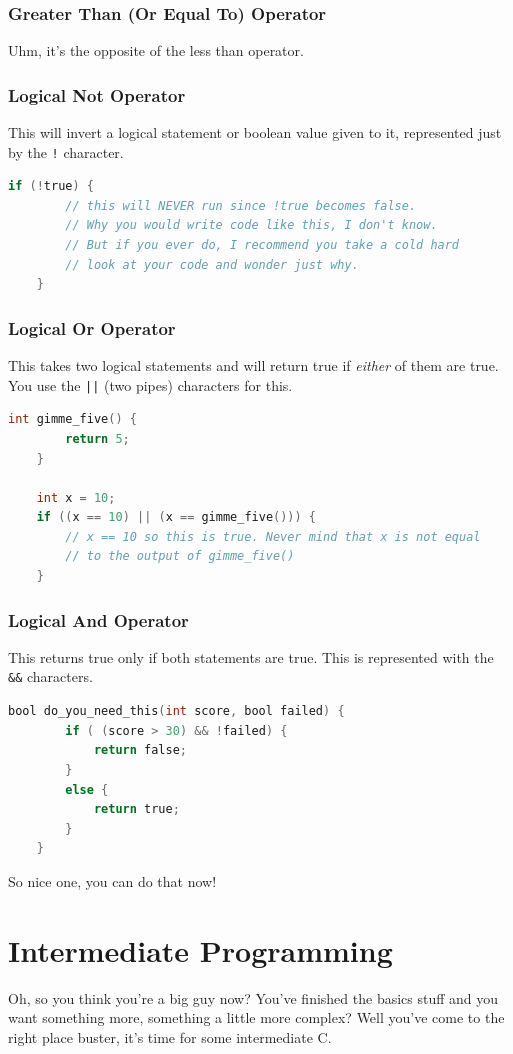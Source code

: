 \subsubsection{Greater Than (Or Equal To) Operator}
Uhm, it's the opposite of the less than operator.

\subsubsection{Logical Not Operator}
This will invert a logical statement or boolean value given to it, represented just by the \texttt{!} character.
\begin{lstlisting}[language=C]
    if (!true) {
        // this will NEVER run since !true becomes false.
        // Why you would write code like this, I don't know.
        // But if you ever do, I recommend you take a cold hard
        // look at your code and wonder just why.
    }
\end{lstlisting}

\subsubsection{Logical Or Operator}
This takes two logical statements and will return true if \textit{either} of them are true. You use the \texttt{||} (two pipes) characters for this.
\begin{lstlisting}[language=C]
    int gimme_five() {
        return 5;
    }

    int x = 10;
    if ((x == 10) || (x == gimme_five())) {
        // x == 10 so this is true. Never mind that x is not equal
        // to the output of gimme_five()
    }
\end{lstlisting}

\subsubsection{Logical And Operator}
This returns true only if both statements are true. This is represented with the \texttt{\&\&} characters.
\begin{lstlisting}[language=C]
    bool do_you_need_this(int score, bool failed) {
        if ( (score > 30) && !failed) {
            return false;
        }
        else {
            return true;
        }
    }
\end{lstlisting}

So nice one, you can do that now!

\section{Intermediate Programming}
Oh, so you think you're a big guy now? You've finished the basics stuff and you want something more, something a little more complex? Well you've come to the right place buster, it's time for some intermediate C.

